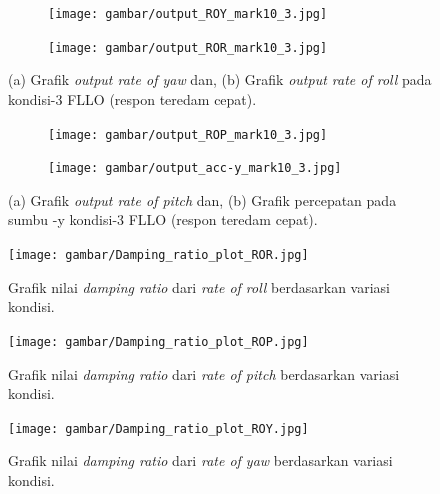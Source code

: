 \begin{figure}[H]
	\centering
	\begin{subfigure}{0.4\textwidth}
	\centering
	\texttt{[image: gambar/output\_ROY\_mark10\_3.jpg]}
	\label{fig:output_ROY_mark10_3}
	\end{subfigure}
	\begin{subfigure}{0.4\textwidth}
	\centering
	\texttt{[image: gambar/output\_ROR\_mark10\_3.jpg]}
	\label{fig:output_ROR_mark10_3}
	\end{subfigure}
	\caption{(a) Grafik \textit{output rate of yaw} dan, (b) Grafik \textit{output rate of roll} pada kondisi-3 FLLO (respon teredam cepat).}
	\label{fig:output_ROY_ROR}
\end{figure}

\begin{figure}[H]
	\centering
	\begin{subfigure}{0.4\textwidth}
		\centering
		\texttt{[image: gambar/output\_ROP\_mark10\_3.jpg]}
		\label{fig:output_ROP_mark10_3}
	\end{subfigure}
	\begin{subfigure}{0.4\textwidth}
		\centering
		\texttt{[image: gambar/output\_acc-y\_mark10\_3.jpg]}
		\label{fig:output_acc-y_mark10_3}
	\end{subfigure}
	\caption{(a) Grafik \textit{output rate of pitch} dan, (b) Grafik percepatan pada sumbu -y kondisi-3 FLLO (respon teredam cepat).}
	\label{fig:output_ROP_acc-y}
\end{figure}

\begin{figure}[h]
	\centering
	\texttt{[image: gambar/Damping\_ratio\_plot\_ROR.jpg]}
	\caption{Grafik nilai \textit{damping ratio} dari \textit{rate of roll} berdasarkan variasi kondisi.}
	\label{fig:plot_ROR}
\end{figure}

\begin{figure}[H]
	\centering
	\texttt{[image: gambar/Damping\_ratio\_plot\_ROP.jpg]}
	\caption{Grafik nilai \textit{damping ratio} dari \textit{rate of pitch} berdasarkan variasi kondisi.}
	\label{fig:plot_ROP}
\end{figure}

\begin{figure}[h]
	\centering
	\texttt{[image: gambar/Damping\_ratio\_plot\_ROY.jpg]}
	\caption{Grafik nilai \textit{damping ratio} dari \textit{rate of yaw} berdasarkan variasi kondisi.}
	\label{fig:plot_ROY}
\end{figure}

